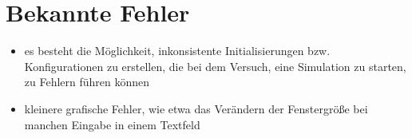 \section{Bekannte Fehler}

\begin{itemize}
\item es besteht die Möglichkeit, inkonsistente Initialisierungen bzw. Konfigurationen zu erstellen, die bei dem Versuch, eine Simulation zu starten, zu Fehlern führen können

\item kleinere grafische Fehler, wie etwa das Verändern der Fenstergröße bei manchen Eingabe in einem Textfeld

\end{itemize}